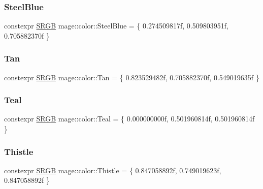 \hypertarget{namespacemage_1_1color_a50f46b6560f7289dcc92f9f651af327d}{}\label{namespacemage_1_1color_a50f46b6560f7289dcc92f9f651af327d} 
\subsubsection{\texorpdfstring{Steel\+Blue}{SteelBlue}}
{\footnotesize\ttfamily constexpr \hyperlink{structmage_1_1_s_r_g_b}{S\+R\+GB} mage\+::color\+::\+Steel\+Blue = \{ 0.\+274509817f, 0.\+509803951f, 0.\+705882370f \}}

\hypertarget{namespacemage_1_1color_a577b28080c4ce3c690ec9f6e82012e11}{}\label{namespacemage_1_1color_a577b28080c4ce3c690ec9f6e82012e11} 
\subsubsection{\texorpdfstring{Tan}{Tan}}
{\footnotesize\ttfamily constexpr \hyperlink{structmage_1_1_s_r_g_b}{S\+R\+GB} mage\+::color\+::\+Tan = \{ 0.\+823529482f, 0.\+705882370f, 0.\+549019635f \}}

\hypertarget{namespacemage_1_1color_a7d93fefcc1c3842f233a444b2a047b31}{}\label{namespacemage_1_1color_a7d93fefcc1c3842f233a444b2a047b31} 
\subsubsection{\texorpdfstring{Teal}{Teal}}
{\footnotesize\ttfamily constexpr \hyperlink{structmage_1_1_s_r_g_b}{S\+R\+GB} mage\+::color\+::\+Teal = \{ 0.\+000000000f, 0.\+501960814f, 0.\+501960814f \}}

\hypertarget{namespacemage_1_1color_a16c371f14ad3400c401638bbb965650b}{}\label{namespacemage_1_1color_a16c371f14ad3400c401638bbb965650b} 
\subsubsection{\texorpdfstring{Thistle}{Thistle}}
{\footnotesize\ttfamily constexpr \hyperlink{structmage_1_1_s_r_g_b}{S\+R\+GB} mage\+::color\+::\+Thistle = \{ 0.\+847058892f, 0.\+749019623f, 0.\+847058892f \}}


